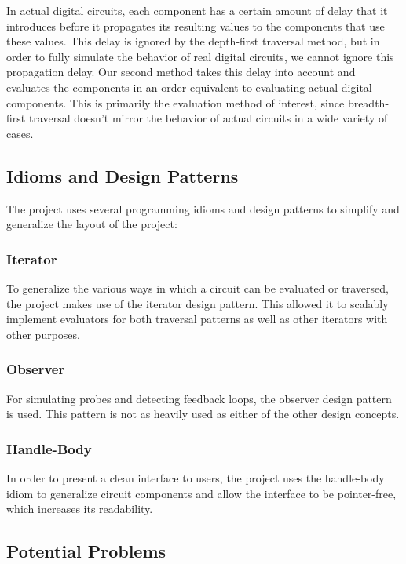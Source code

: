 \documentclass{article}
\begin{document}
In actual digital circuits, each component has a certain amount of delay that it introduces before it propagates its resulting values to the components that use these values. This delay is ignored by the depth-first traversal method, but in order to fully simulate the behavior of real digital circuits, we cannot ignore this propagation delay. Our second method takes this delay into account and evaluates the components in an order equivalent to evaluating actual digital components. This is primarily the evaluation method of interest, since breadth-first traversal doesn’t mirror the behavior of actual circuits in a wide variety of cases.

\subsection{Idioms and Design Patterns}

The project uses several programming idioms and design patterns to simplify and generalize the layout of the project:

\subsubsection{Iterator}

To generalize the various ways in which a circuit can be evaluated or traversed, the project makes use of the iterator design pattern. This allowed it to scalably implement evaluators for both traversal patterns as well as other iterators with other purposes.

\subsubsection{Observer}

For simulating probes and detecting feedback loops, the observer design pattern is used. This pattern is not as heavily used as either of the other design concepts.

\subsubsection{Handle-Body}

In order to present a clean interface to users, the project uses the handle-body idiom to generalize circuit components and allow the interface to be pointer-free, which increases its readability.

\subsection{Potential Problems}
\end{document}
